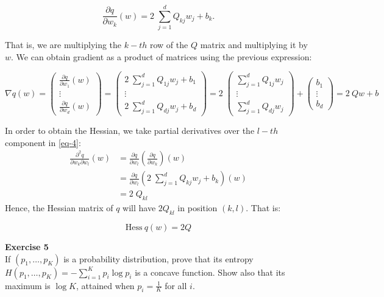 \documentclass[11pt,table]{article}
\newenvironment{problem}[2][Exercise]
{ \begin{mdframed}[backgroundcolor=gray!20] \textbf{#1 #2} \\}
	{  \end{mdframed}}
\begin{document}
\begin{equation}
	\label{eq-4}
	\frac{\partial q}{\partial w_k} (w) = 2 \; \sum_{j=1}^{d} Q_{kj} w_{j} + b_{k}.
\end{equation}

That is, we are multiplying the \(k-th\) row of the \(Q\) matrix and multiplying it by \(w\). We can obtain gradient as a product of matrices using the previous expression:

\[
	\nabla q(w) = \begin{pmatrix}
		\frac{\partial q}{\partial w_1} (w) \\
		\vdots                              \\
		\frac{\partial q}{\partial w_d} (w)
	\end{pmatrix}
	= \begin{pmatrix}
		2 \; \sum_{j=1}^{d} Q_{1j} w_{j} + b_{1} \\
		\vdots                                   \\
		2 \; \sum_{j=1}^{d} Q_{dj} w_{j} + b_{d}
	\end{pmatrix}
	= 2 \; \begin{pmatrix}
		\sum_{j=1}^{d} Q_{1j} w_{j} \\
		\vdots                      \\
		\sum_{j=1}^{d} Q_{dj} w_{j}
	\end{pmatrix} + \begin{pmatrix}
		b_{1}  \\
		\vdots \\
		b_{d}
	\end{pmatrix}
	= 2 \ Qw + b
\]

In order to obtain the Hessian, we take partial derivatives over the \(l-th\) component in \ref{eq-4}:
\begin{align*}
	\frac{\partial^2 q}{\partial w_k \partial w_l} (w) & = \frac{\partial q}{\partial w_l} \left( \frac{\partial q}{\partial w_k} \right) (w)          \\
	                                                   & = \frac{\partial q}{\partial w_l} \left( 2 \; \sum_{j=1}^{d} Q_{kj} w_{j} + b_{k} \right) (w) \\
	                                                   & = 2 \; Q_{kl}
\end{align*}
Hence, the Hessian matrix of \(q\) will have \(2 Q_{kl}\) in position \((k, l)\). That is:

\[
	\text{Hess} \ q(w) = 2Q
\]

\begin{problem}{5}
If \( (p_1,\dots,p_K) \) is a probability distribution, prove that its entropy \( H(p_1, \dots, p_K) = - \sum_{i=1}^K p_i \log p_i\) is a concave function. Show also that its maximum is \( \log K \), attained when \( p_i = \frac{1}{K}\) for all $i$.
\end{problem}
\end{document}
